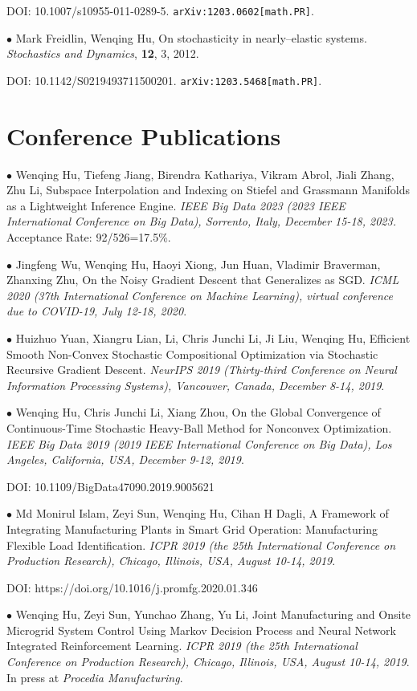\documentclass[margin,line]{res}
\begin{document}
\begin{resume}
DOI: 10.1007/s10955-011-0289-5. \verb"arXiv:1203.0602[math.PR]".


$\bullet$ Mark Freidlin, Wenqing Hu, On stochasticity in
nearly--elastic systems. \textit{Stochastics and Dynamics},
\textbf{12}, 3, 2012.

DOI: 10.1142/S0219493711500201. \verb"arXiv:1203.5468[math.PR]". 


\section{\sc Conference Publications}

$\bullet$ Wenqing Hu, Tiefeng Jiang, Birendra Kathariya, Vikram Abrol, Jiali Zhang, Zhu Li, Subspace Interpolation and Indexing on Stiefel and Grassmann Manifolds as a Lightweight Inference Engine. \textit{IEEE Big Data 2023 (2023 IEEE International Conference on Big Data), Sorrento, Italy, December 15-18, 2023.} Acceptance Rate: 92/526=17.5\%.

$\bullet$ Jingfeng Wu, Wenqing Hu, Haoyi Xiong, Jun Huan, Vladimir Braverman, Zhanxing Zhu, On the Noisy Gradient Descent that Generalizes as SGD. \textit{ICML 2020 (37th International Conference on Machine Learning), virtual conference due to COVID-19, July 12-18, 2020}.

$\bullet$ Huizhuo Yuan, Xiangru Lian, Li, Chris Junchi Li, Ji Liu, Wenqing Hu, Efficient Smooth Non-Convex Stochastic Compositional Optimization via Stochastic Recursive Gradient Descent. \textit{NeurIPS 2019 (Thirty-third Conference on Neural Information Processing Systems), Vancouver, Canada, December 8-14, 2019}.

$\bullet$ Wenqing Hu, Chris Junchi Li, Xiang Zhou, On the Global Convergence of Continuous-Time Stochastic Heavy-Ball Method for Nonconvex Optimization. \textit{IEEE Big Data 2019 (2019 IEEE International Conference on Big Data), Los Angeles, California, USA, December 9-12, 2019}. 

DOI: 10.1109/BigData47090.2019.9005621

$\bullet$ Md Monirul Islam, Zeyi Sun, Wenqing Hu, Cihan H Dagli, A Framework of Integrating Manufacturing Plants in Smart Grid Operation: Manufacturing Flexible Load Identification. \textit{ICPR 2019 (the 25th International Conference on Production Research), Chicago, Illinois, USA, August 10-14, 2019}.

DOI: https://doi.org/10.1016/j.promfg.2020.01.346

$\bullet$ Wenqing Hu, Zeyi Sun, Yunchao Zhang, Yu Li, Joint Manufacturing and Onsite Microgrid System Control Using Markov Decision Process and Neural Network Integrated Reinforcement Learning. \textit{ICPR 2019 (the 25th International Conference on Production Research), Chicago, Illinois, USA, August 10-14, 2019}.
In press at \textit{Procedia Manufacturing}.


\end{resume}
\end{document}

